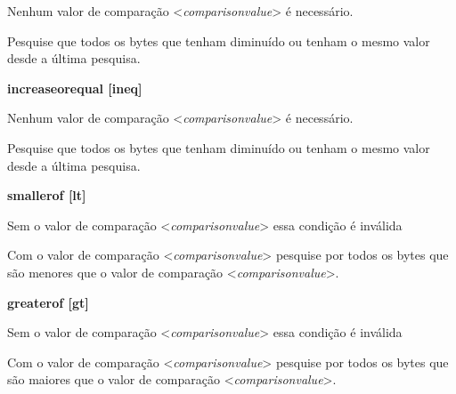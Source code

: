 \documentclass[letterpaper,10pt,brazil]{sphinxmanual}
\begin{document}
\begin{DUlineblock}{0em}
\begin{DUlineblock}{\DUlineblockindent}
\end{DUlineblock}
\item[] Nenhum valor de comparação \textless{}\emph{comparisonvalue}\textgreater{} é necessário.
\item[] 
\item[] Pesquise que todos os bytes que tenham diminuído ou tenham o mesmo valor desde a última pesquisa.
\item[] 
\item[]
\begin{DUlineblock}{\DUlineblockindent}
\item[] \textbf{increaseorequal {[}ineq{]}}
\item[] 
\end{DUlineblock}
\item[] Nenhum valor de comparação \textless{}\emph{comparisonvalue}\textgreater{} é necessário.
\item[] 
\item[] Pesquise que todos os bytes que tenham diminuído ou tenham o mesmo valor desde a última pesquisa.
\item[] 
\item[]
\begin{DUlineblock}{\DUlineblockindent}
\item[] \textbf{smallerof {[}lt{]}}
\item[] 
\end{DUlineblock}
\item[] Sem o valor de comparação \textless{}\emph{comparisonvalue}\textgreater{} essa condição é inválida
\item[] Com o valor de comparação \textless{}\emph{comparisonvalue}\textgreater{} pesquise por todos os bytes que são menores que o valor de comparação \textless{}\emph{comparisonvalue}\textgreater{}.
\item[] 
\item[]
\begin{DUlineblock}{\DUlineblockindent}
\item[] \textbf{greaterof {[}gt{]}}
\item[] 
\end{DUlineblock}
\item[] Sem o valor de comparação \textless{}\emph{comparisonvalue}\textgreater{} essa condição é inválida
\item[] Com o valor de comparação \textless{}\emph{comparisonvalue}\textgreater{} pesquise por todos os bytes que são maiores que o valor de comparação \textless{}\emph{comparisonvalue}\textgreater{}.
\item[] 

\end{DUlineblock}
\end{document}

